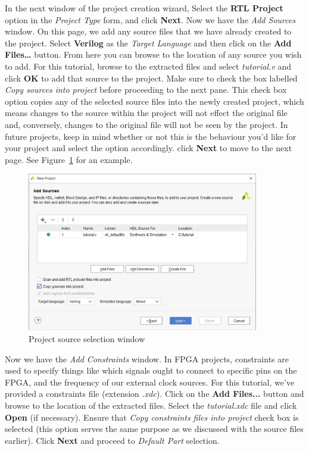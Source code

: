 \documentclass[11pt]{article}
\begin{document}
In the next window of the project creation wizard, Select the \textbf{RTL Project} option in the \textit{Project Type} form, and click \textbf{Next}. Now we have the \textit{Add Sources} window. On this page, we add any source files that we have already created to the project. Select \textbf{Verilog} as the \textit{Target Language} and then click on the \textbf{Add Files…} button. From here you can browse to the location of any source you wish to add. For this tutorial, browse to the extracted files and select \textit{tutorial.v} and click \textbf{OK} to add that source to the project. Make sure to check the box labelled \textit{Copy sources into project} before proceeding to the next pane. This check box option copies any of the selected source files into the newly created project, which means changes to the source within the project will not effect the original file and, conversely, changes to the original file will not be seen by the project. In future projects, keep in mind whether or not this is the behaviour you'd like for your project and select the option accordingly. click \textbf{Next} to move to the next page. See Figure~\ref{fig:new_proj_src} for an example.

\begin{figure}[!h]
    \centering
    \includegraphics[width=0.9\textwidth]{images/new_proj_src.png}
    \caption{Project source selection window}
    \label{fig:new_proj_src}
\end{figure}

Now we have the \textit{Add Constraints} window. In FPGA projects, constraints are used to specify things like which signals ought to connect to specific pins on the FPGA, and the frequency of our external clock sources. For this tutorial, we've provided a constraints file (extension \textit{.xdc}).  Click on the \textbf{Add Files...} button and browse to the location of the extracted files. Select the \textit{tutorial.xdc} file and click \textbf{Open} (if necessary). Ensure that \textit{Copy constraints files into project} check box is selected (this option serves the same purpose as we discussed with the source files earlier). Click \textbf{Next} and proceed to \textit{Default Part} selection.
\end{document}
